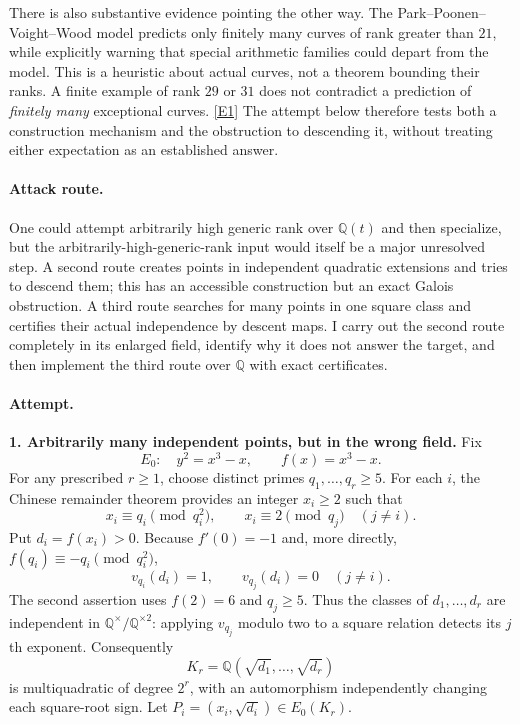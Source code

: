 \documentclass[11pt,a4paper]{article}
\newcommand{\Q}{\mathbb{Q}}
\newcommand{\eref}[2]{\hyperlink{extra:#1:#2}{[E#2]}}
\numberwithin{equation}{section}
\begin{document}
There is also substantive evidence pointing the other way. The
Park--Poonen--Voight--Wood model predicts only finitely many curves of rank
greater than $21$, while explicitly warning that special arithmetic families
could depart from the model. This is a heuristic about actual curves, not
a theorem bounding their ranks. A finite example of rank $29$ or $31$ does
not contradict a prediction of \emph{finitely many} exceptional curves.
\eref{107}{1} The attempt below therefore tests both a construction mechanism
and the obstruction to descending it, without treating either expectation
as an established answer.

\paragraph{Attack route.}
One could attempt arbitrarily high generic rank over $\Q(t)$ and then
specialize, but the arbitrarily-high-generic-rank input would itself be a
major unresolved step. A second route creates points in independent quadratic
extensions and tries to descend them; this has an accessible construction
but an exact Galois obstruction. A third route searches for many points in
one square class and certifies their actual independence by descent maps.
I carry out the second route completely in its enlarged field, identify why
it does not answer the target, and then implement the third route over
$\Q$ with exact certificates.

\paragraph{Attempt.}
\textbf{1. Arbitrarily many independent points, but in the wrong field.}
Fix
\[
 E_0:\quad y^2=x^3-x,
 \qquad f(x)=x^3-x.
\]
For any prescribed $r\geq1$, choose distinct primes $q_1,\ldots,q_r\geq5$.
For each $i$, the Chinese remainder theorem provides an integer $x_i\geq2$
such that
\begin{equation}\label{107:crt}
 x_i\equiv q_i\pmod{q_i^2},\qquad
 x_i\equiv2\pmod{q_j}\quad(j\neq i).
\end{equation}
Put $d_i=f(x_i)>0$. Because $f'(0)=-1$ and, more directly,
$f(q_i)\equiv-q_i\pmod{q_i^2}$,
\[
 v_{q_i}(d_i)=1,\qquad v_{q_j}(d_i)=0\quad(j\neq i).
\]
The second assertion uses $f(2)=6$ and $q_j\geq5$. Thus the classes of
$d_1,\ldots,d_r$ are independent in $\Q^\times/\Q^{\times2}$: applying
$v_{q_j}$ modulo two to a square relation detects its $j$th exponent.
Consequently
\[
 K_r=\Q(\sqrt{d_1},\ldots,\sqrt{d_r})
\]
is multiquadratic of degree $2^r$, with an automorphism independently
changing each square-root sign. Let $P_i=(x_i,\sqrt{d_i})\in E_0(K_r)$.
\end{document}
